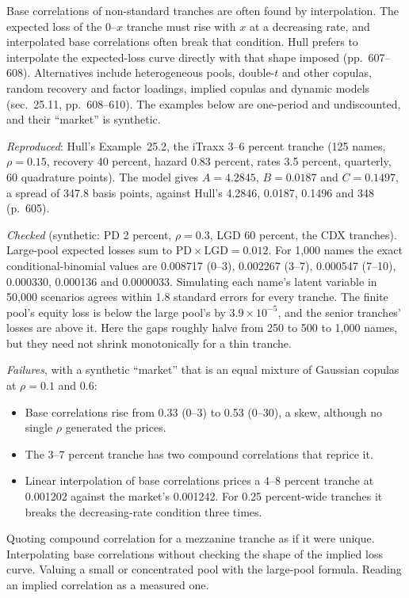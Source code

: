 \begin{qfmethod}
 Base correlations of non-standard tranches are often found by interpolation. The expected loss of the $0$--$x$ tranche must rise with $x$ at a decreasing rate, and interpolated base correlations often break that condition. Hull prefers to interpolate the expected-loss curve directly with that shape imposed (pp.~607--608). Alternatives include heterogeneous pools, double-$t$ and other copulas, random recovery and factor loadings, implied copulas and dynamic models (sec.~25.11, pp.~608--610). The examples below are one-period and undiscounted, and their ``market'' is synthetic.

 \emph{Reproduced}: Hull's Example~25.2, the iTraxx 3--6 percent tranche (125 names, $\rho=0.15$, recovery 40 percent, hazard 0.83 percent, rates 3.5 percent, quarterly, 60 quadrature points). The model gives $A=4.2845$, $B=0.0187$ and $C=0.1497$, a spread of 347.8 basis points, against Hull's 4.2846, 0.0187, 0.1496 and 348 (p.~605).

\emph{Checked} (synthetic: PD 2 percent, $\rho=0.3$, LGD 60 percent, the CDX tranches). Large-pool expected losses sum to $\mathrm{PD}\times\mathrm{LGD}=0.012$. For 1{,}000 names the exact conditional-binomial values are 0.008717 (0--3), 0.002267 (3--7), 0.000547 (7--10), 0.000330, 0.000136 and 0.0000033. Simulating each name's latent variable in 50{,}000 scenarios agrees within 1.8 standard errors for every tranche. The finite pool's equity loss is below the large pool's by $3.9\times10^{-5}$, and the senior tranches' losses are above it. Here the gaps roughly halve from 250 to 500 to 1{,}000 names, but they need not shrink monotonically for a thin tranche.

\emph{Failures}, with a synthetic ``market'' that is an equal mixture of Gaussian copulas at $\rho=0.1$ and 0.6:
\begin{itemize}
\item Base correlations rise from 0.33 (0--3) to 0.53 (0--30), a skew, although no single $\rho$ generated the prices.
\item The 3--7 percent tranche has two compound correlations that reprice it.
\item Linear interpolation of base correlations prices a 4--8 percent tranche at 0.001202 against the market's 0.001242. For 0.25 percent-wide tranches it breaks the decreasing-rate condition three times.
\end{itemize}

 Quoting compound correlation for a mezzanine tranche as if it were unique. Interpolating base correlations without checking the shape of the implied loss curve. Valuing a small or concentrated pool with the large-pool formula. Reading an implied correlation as a measured one.


\end{qfmethod}
